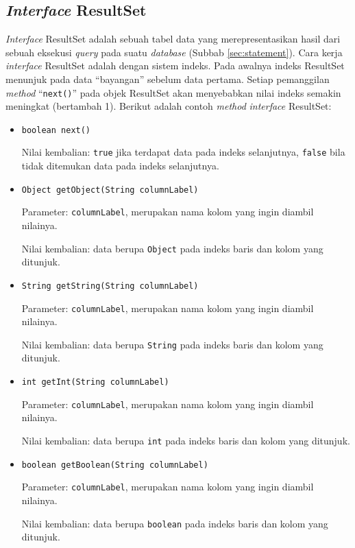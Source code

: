 \subsection{\textit{Interface} ResultSet}
\label{sec:resultset}
\textit{Interface} ResultSet adalah sebuah tabel data yang merepresentasikan hasil dari sebuah eksekusi \textit{query} pada suatu \textit{database}\cite{javadocumentation} (Subbab \ref{sec:statement}). Cara kerja \textit{interface} ResultSet adalah dengan sistem indeks. Pada awalnya indeks ResultSet menunjuk pada data ``bayangan'' sebelum data pertama. Setiap pemanggilan \textit{method} ``\texttt{next()}'' pada objek ResultSet akan menyebabkan nilai indeks semakin meningkat (bertambah 1). Berikut adalah contoh \textit{method} \textit{interface} ResultSet:
\begin{itemize}
	\item \texttt{boolean next()}
	
	Nilai kembalian: \texttt{true} jika terdapat data pada indeks selanjutnya, \texttt{false} bila tidak ditemukan data pada indeks selanjutnya.

	\item \texttt{Object getObject(String columnLabel)}
	
	Parameter: \texttt{columnLabel}, merupakan nama kolom yang ingin diambil nilainya.
	
	Nilai kembalian: data berupa \texttt{Object} pada indeks baris dan kolom yang ditunjuk.
	
	\item \texttt{String getString(String columnLabel)}
	
	Parameter: \texttt{columnLabel}, merupakan nama kolom yang ingin diambil nilainya.
	
	Nilai kembalian: data berupa \texttt{String} pada indeks baris dan kolom yang ditunjuk.
	
	\item \texttt{int getInt(String columnLabel)}
	
	Parameter: \texttt{columnLabel}, merupakan nama kolom yang ingin diambil nilainya.
	
	Nilai kembalian: data berupa \texttt{int} pada indeks baris dan kolom yang ditunjuk.
	
	\item \texttt{boolean getBoolean(String columnLabel)}
	
	Parameter: \texttt{columnLabel}, merupakan nama kolom yang ingin diambil nilainya.
	
	Nilai kembalian: data berupa \texttt{boolean} pada indeks baris dan kolom yang ditunjuk.
\end{itemize}



